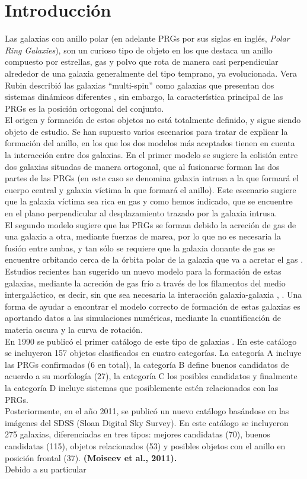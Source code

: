 \documentclass{article}
\begin{document}
\section{Introducción}
Las galaxias con anillo polar (en adelante PRGs por sus siglas en inglés, \emph{Polar Ring Galaxies}), son un curioso tipo de objeto en los que destaca un anillo compuesto por estrellas, gas y polvo que rota de manera casi perpendicular alrededor de una galaxia generalmente del tipo temprano, ya evolucionada. Vera Rubin describió las galaxias ``multi-spin'' como galaxias que presentan dos sistemas dinámicos diferentes \cite{Rubin1994d}, sin embargo, la característica principal de las PRGs es la posición ortogonal del conjunto.\\El origen y formación de estos objetos no está totalmente definido, y sigue siendo objeto de estudio. Se han supuesto varios escenarios para tratar de explicar la formación del anillo, en los que los dos modelos más aceptados tienen en cuenta la interacción entre dos galaxias. En el primer modelo se sugiere la colisión entre dos galaxias situadas de manera ortogonal, que al fusionarse forman las dos partes de las PRGs (en este caso se denomina galaxia intrusa a la que formará el cuerpo central y galaxia víctima la que formará el anillo). Este escenario sugiere que la galaxia víctima sea rica en gas y como hemos indicado, que se encuentre en el plano perpendicular al desplazamiento trazado por la galaxia intrusa\cite{Bournaud2003}.\\El segundo modelo sugiere que las PRGs se forman debido la acreción de gas de una galaxia a otra, mediante fuerzas de marea, por lo que no es necesaria la fusión entre ambas, y tan sólo se requiere que la galaxia donante de gas se encuentre orbitando cerca de la órbita polar de la galaxia que va a acretar el gas \cite{Bournaud2003}. Estudios recientes han sugerido un nuevo modelo para la formación de estas galaxias, mediante la acreción de gas frío a través de los filamentos del medio intergaláctico, es decir, sin que sea necesaria la interacción galaxia-galaxia \cite{Brook2008}, \cite{Iodice2014}. Una forma de ayudar a encontrar el modelo correcto de formación de estas galaxias es aportando datos a las simulaciones numéricas, mediante la cuantificación de materia oscura y la curva de rotación.\\En 1990 se publicó el primer catálogo de este tipo de galaxias \cite{Whitmore1990}. En este catálogo se incluyeron 157 objetos clasificados en cuatro categorías. La categoría A incluye las PRGs confirmadas (6 en total), la categoría B define buenos candidatos de acuerdo a su morfología (27), la categoría C los posibles candidatos y finalmente la categoría D incluye sistemas que posiblemente estén relacionados con las PRGs.\\Posteriormente, en el año 2011, se publicó un nuevo catálogo basándose en las imágenes del SDSS (Sloan Digital Sky Survey). En este catálogo se incluyeron 275 galaxias, diferenciadas en tres tipos: mejores candidatas (70), buenos candidatas (115), objetos relacionados (53) y posibles objetos con el anillo en posición frontal (37). \textbf{(Moiseev et al., 2011).}\\Debido a su particular 
\end{document}
